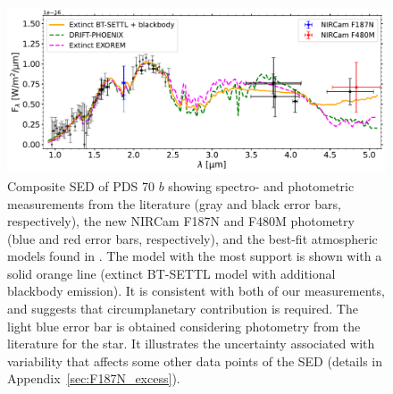 \documentclass[longauth]{aa}
\newcommand{\new}[1]{#1}
\begin{document}
\begin{figure}[!t]
\centering
\includegraphics[width=\textwidth]{Fig2_v9.pdf}
\caption{Composite SED of PDS 70 $b$ showing spectro- and photometric measurements from the literature (gray and black error bars, respectively), the new NIRCam F187N and F480M photometry %
(blue and red error bars, respectively), and %
the best-fit atmospheric models found in \cite{Wang2021}. The model with the most support is shown with a solid orange line (extinct BT-SETTL model with additional blackbody emission). It is consistent with both of our measurements, and suggests that circumplanetary contribution is required. %
The light blue error bar is obtained %
considering photometry from the literature for the star. %
It illustrates the uncertainty associated with variability that affects \new{some} other data points of the SED (details in Appendix~\ref{sec:F187N_excess}). %
}
\label{fig:spec_b}
\end{figure}
\end{document}
